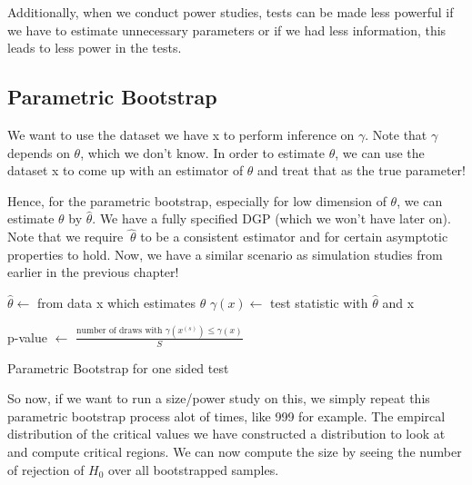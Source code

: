 \documentclass[twoside]{article}
\begin{document}
Additionally, when we conduct power studies, tests can be made less powerful if we have to estimate unnecessary parameters or if we had less information, this leads to less power in the tests.

\subsection{Parametric Bootstrap}

We want to use the dataset we have x to perform inference on $\gamma$. Note that $\gamma$ depends on $\theta$, which we don't know. In order to estimate $\theta$, we can use the dataset x to come up with an estimator of $\theta$ and treat that as the true parameter!

Hence, for the parametric bootstrap, especially for low dimension of $\theta$, we can estimate $\theta$ by $\hat{\theta}$. We have a fully specified DGP (which we won't have later on). Note that we require $\hat{\
\theta}$ to be a consistent estimator and for certain asymptotic properties to hold. Now, we have a similar scenario as simulation studies from earlier in the previous chapter!

\begin{algorithm}
\DontPrintSemicolon
{}
\KwOut{P-value}

$\hat{\theta} \gets$ from data x which estimates $\theta$\;
$\gamma(x) \gets$ test statistic with $\hat{\theta}$ and x\;

p-value $\gets$ $\frac{\text{number of draws with }\gamma(x^{(s)})\leq\gamma(x)}{S}$\;


\caption{{\sc Parametric Bootstrap for one sided test}}
\label{algo:duplicate}
\end{algorithm}

So now, if we want to run a size/power study on this, we simply repeat this parametric bootstrap process alot of times, like 999 for example. The empircal distribution of the critical values we have constructed a distribution to look at and compute critical regions. We can now compute the size by seeing the number of rejection of $H_0$ over all bootstrapped samples.
\end{document}
